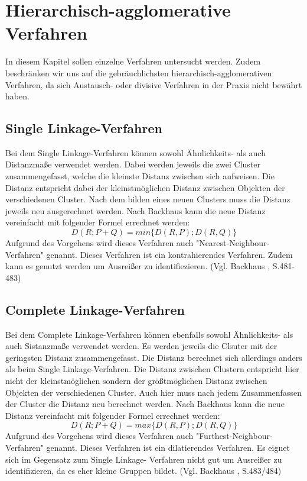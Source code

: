 \chapter{Hierarchisch-agglomerative Verfahren}

In diesem Kapitel sollen einzelne Verfahren untersucht werden. Zudem beschränken wir uns auf die gebräuchlichsten hierarchisch-agglomerativen Verfahren, da sich Austausch- oder divisive Verfahren in der Praxis nicht bewährt haben.

\section{Single Linkage-Verfahren}
Bei dem Single Linkage-Verfahren können sowohl Ähnlichkeits- als auch Distanzmaße verwendet werden. Dabei werden jeweils die zwei Cluster zusammengefasst, welche die kleinste Distanz zwischen sich aufweisen. Die Distanz entspricht dabei der kleinstmöglichen Distanz zwischen Objekten der verschiedenen Cluster. Nach dem bilden eines neuen Clusters muss die Distanz jeweils neu ausgerechnet werden. 
Nach Backhaus \cite{Backhaus.2016} kann die neue Distanz vereinfacht mit folgender Formel errechnet werden:
\begin{equation}
D(R;P+Q) = min\{D(R,P);D(R,Q)\}
\end{equation}
Aufgrund des Vorgehens wird dieses Verfahren auch "Nearest-Neighbour-Verfahren" genannt.
Dieses Verfahren ist ein kontrahierendes Verfahren. Zudem kann es genutzt werden um Ausreißer zu identifiezieren. (Vgl. Backhaus \cite{Backhaus.2016}, S.481-483)

\section{Complete Linkage-Verfahren}
Bei dem Complete Linkage-Verfahren können ebenfalls sowohl Ähnlichkeits- als auch Sistanzmaße verwendet werden. Es werden jeweils die Clsuter mit der geringsten Distanz zusammengefasst. Die Distanz berechnet sich allerdings anders als beim Single Linkage-Verfahren. Die Distanz zwischen Clustern entspricht hier nicht der kleinstmöglichen sondern der größtmöglichen Distanz zwischen Objekten der verschiedenen Cluster. Auch hier muss nach jedem Zusammenfassen der Cluster die Distanz neu berechnet werden.
Nach Backhaus \cite{Backhaus.2016} kann die neue Distanz vereinfacht mit folgender Formel errechnet werden:
\begin{equation}
D(R;P+Q) = max\{D(R,P);D(R,Q)\}
\end{equation}
Aufgrund des Vorgehens wird dieses Verfahren auch "Furthest-Neighbour-Verfahren" genannt.
Dieses Verfahren ist ein dilatierendes Verfahren. Es eignet sich im Gegensatz zum Single Linkage- Verfahren nicht gut um Ausreißer zu identifizieren, da es eher kleine Gruppen bildet. (Vgl. Backhaus \cite{Backhaus.2016}, S.483/484)

